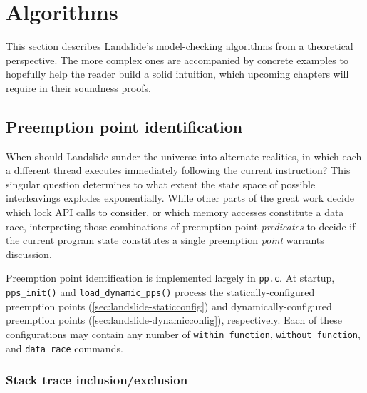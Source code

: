 
\section{Algorithms}
\label{sec:landslide-algs}

This section describes Landslide's model-checking algorithms from a theoretical perspective.
The more complex ones are accompanied by concrete examples to hopefully help the reader build a solid intuition,
which upcoming chapters will require in their soundness proofs.


\subsection{Preemption point identification}
\label{sec:landslide-pps}

When should Landslide sunder the universe into alternate realities,
in which each a different thread executes immediately following the current instruction?
This singular question determines to what extent the state space of possible interleavings explodes exponentially.
While other parts of
the great work %
decide which lock API calls to consider,
or which memory accesses constitute a data race,
interpreting those combinations of preemption point {\em predicates}
to decide if the current program state constitutes a single preemption {\em point}
warrants discussion.

Preemption point identification is implemented largely in {\tt pp.c}.
At startup, {\tt pps\_init()} and {\tt load\_dynamic\_pps()} process the
statically-configured preemption points (\cref{sec:landslide-staticconfig})
and dynamically-configured preemption points (\cref{sec:landslide-dynamicconfig}),
respectively.
Each of these configurations may contain any number of
{\tt within\_function}, {\tt without\_function}, and {\tt data\_\allowbreak{}race} commands.

\subsubsection{Stack trace inclusion/exclusion}

